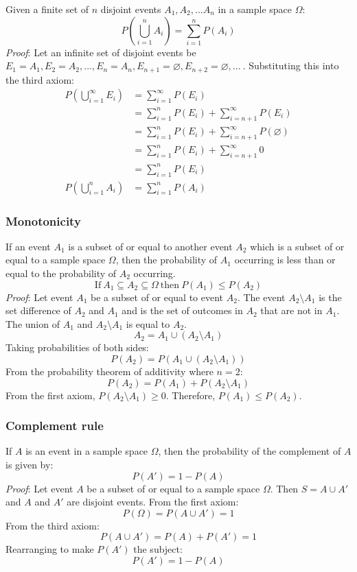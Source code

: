 \documentclass{article}
\begin{document}
Given a finite set of $n$ disjoint events ${A_1, A_2, ... A_n}$ in a sample space $\Omega$:
\[P(\bigcup_{i=1}^n A_i) = \sum_{i=1}^n P(A_i)\]
\textit{Proof}: Let an infinite set of disjoint events be $E_1 = A_1, E_2 = A_2, ... , E_n = A_n, E_{n+1} = \varnothing, E_{n+2} = \varnothing, ... \ $. Substituting this into the third axiom:
\begin{equation}
\begin{split}
P(\bigcup_{i=1}^\infty E_i) & = \sum_{i=1}^\infty P(E_i) \\
 & =\sum_{i=1}^n P(E_i) + \sum_{i=n+1}^\infty P(E_i) \\
 & =\sum_{i=1}^n P(E_i) + \sum_{i=n+1}^\infty P(\varnothing) \\
 & =\sum_{i=1}^n P(E_i) + \sum_{i=n+1}^\infty 0 \\
 & =\sum_{i=1}^n P(E_i) \\
P(\bigcup_{i=1}^n A_i) & = \sum_{i=1}^n P(A_i)
\end{split}
\end{equation}

\subsubsection{Monotonicity}

If an event $A_1$ is a subset of or equal to another event $A_2$ which is a subset of or equal to a sample space $\Omega$, then the probability of $A_1$ occurring is less than or equal to the probability of $A_2$ occurring.
\[\mathrm{If} \ A_1 \subseteq A_2 \subseteq \Omega \ \mathrm{then} \ P(A_1) \leq P(A_2)\]
\textit{Proof}: Let event $A_1$ be a subset of or equal to event $A_2$. The event $A_2 \setminus A_1$ is the set difference of $A_2$ and $A_1$ and is the set of outcomes in $A_2$ that are not in $A_1$. The union of $A_1$ and $A_2 \setminus A_1$ is equal to $A_2$.
\[A_2=A_1 \cup (A_2 \setminus A_1)\]
Taking probabilities of both sides:
\[P(A_2)=P(A_1 \cup (A_2 \setminus A_1))\]
From the probability theorem of additivity where $n=2$:
\[P(A_2)=P(A_1) + P(A_2 \setminus A_1)\]
From the first axiom, $P(A_2 \setminus A_1) \geq 0$. Therefore, $P(A_1) \leq P(A_2)$. 

\subsubsection{Complement rule}

If $A$ is an event in a sample space $\Omega$, then the probability of the complement of $A$ is given by:
\[P(A')=1-P(A)\]
\textit{Proof}: Let event $A$ be a subset of or equal to a sample space $\Omega$. Then $S=A \cup A'$ and $A$ and $A'$ are disjoint events. From the first axiom:
\[P(\Omega) = P(A \cup A') = 1\]
From the third axiom:
\[P(A \cup A') = P(A)+P(A') = 1\]
Rearranging to make $P(A')$ the subject:
\[P(A') = 1-P(A)\]
\end{document}
